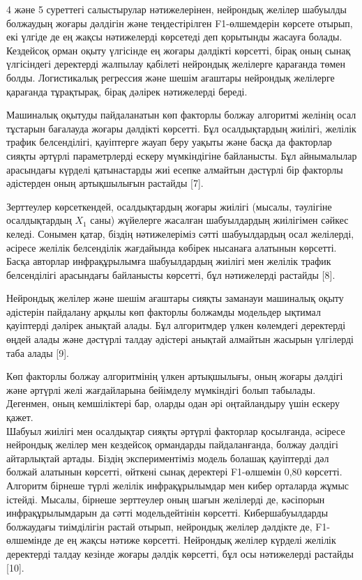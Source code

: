 \begin{multicols}{2}
4 және 5 суреттегі салыстырулар нәтижелерінен, нейрондық желілер
шабуылды болжаудың жоғары дәлдігін және теңдестірілген F1-өлшемдерін
көрсете отырып, екі үлгіде де ең жақсы нәтижелерді көрсетеді деп
қорытынды жасауға болады. Кездейсоқ орман оқыту үлгісінде ең жоғары
дәлдікті көрсетті, бірақ оның сынақ үлгісіндегі деректерді жалпылау
қабілеті нейрондық желілерге қарағанда төмен болды. Логистикалық
регрессия және шешім ағаштары нейрондық желілерге қарағанда тұрақтырақ,
бірақ дәлірек нәтижелерді береді.

Машиналық оқытуды пайдаланатын көп факторлы болжау алгоритмі желінің
осал тұстарын бағалауда жоғары дәлдікті көрсетті. Бұл осалдықтардың
жиілігі, желілік трафик белсенділігі, қауіптерге жауап беру уақыты және
басқа да факторлар сияқты әртүрлі параметрлерді ескеру мүмкіндігіне
байланысты. Бұл айнымалылар арасындағы күрделі қатынастарды жиі есепке
алмайтын дәстүрлі бір факторлы әдістерден оның артықшылығын растайды
{[}7{]}.

Зерттеулер көрсеткендей, осалдықтардың жоғары жиілігі (мысалы, тәулігіне
осалдықтардың \(X_{1}\) саны) жүйелерге жасалған шабуылдардың жиілігімен
сәйкес келеді. Сонымен қатар, біздің нәтижелеріміз сәтті шабуылдардың
осал желілерді, әсіресе желілік белсенділік жағдайында көбірек нысанаға
алатынын көрсетті. Басқа авторлар инфрақұрылымға шабуылдардың жиілігі
мен желілік трафик белсенділігі арасындағы байланысты көрсетті, бұл
нәтижелерді растайды {[}8{]}.

Нейрондық желілер және шешім ағаштары сияқты заманауи машиналық оқыту
әдістерін пайдалану арқылы көп факторлы болжамды модельдер ықтимал
қауіптерді дәлірек анықтай алады. Бұл алгоритмдер үлкен көлемдегі
деректерді өңдей алады және дәстүрлі талдау әдістері анықтай алмайтын
жасырын үлгілерді таба алады {[}9{]}.

Көп факторлы болжау алгоритмінің үлкен артықшылығы, оның жоғары дәлдігі
және әртүрлі желі жағдайларына бейімделу мүмкіндігі болып табылады.
Дегенмен, оның кемшіліктері бар, оларды одан әрі оңтайландыру үшін
ескеру қажет.\\
Шабуыл жиілігі мен осалдықтар сияқты әртүрлі факторлар қосылғанда,
әсіресе нейрондық желілер мен кездейсоқ ормандарды пайдаланғанда, болжау
дәлдігі айтарлықтай артады. Біздің экспериментіміз модель болашақ
қауіптерді дәл болжай алатынын көрсетті, өйткені сынақ деректері
F1-өлшемін 0,80 көрсетті. Алгоритм бірнеше түрлі желілік инфрақұрылымдар
мен кибер орталарда жұмыс істейді. Мысалы, бірнеше зерттеулер оның шағын
желілерді де, кәсіпорын инфрақұрылымдарын да сәтті модельдейтінін
көрсетті. Кибершабуылдарды болжаудағы тиімділігін растай отырып,
нейрондық желілер дәлдікте де, F1-өлшемінде де ең жақсы нәтиже көрсетті.
Нейрондық желілер күрделі желілік деректерді талдау кезінде жоғары
дәлдік көрсетті, бұл осы нәтижелерді растайды {[}10{]}.


\end{multicols}
